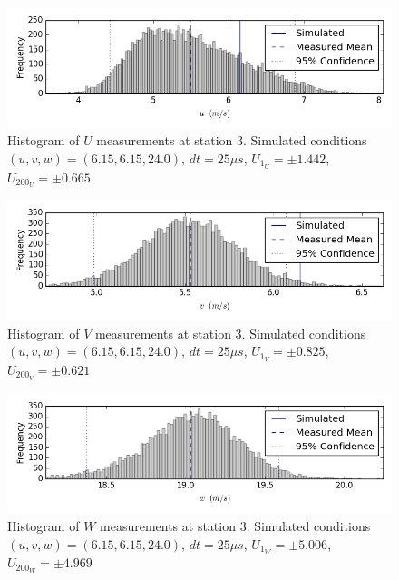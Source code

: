\begin{figure}[H]
\centering
\includegraphics[width=6in]{figs/Ely_May28th03001/uncertainty_Ely_May28th03001_U}
\caption{Histogram of $U$ measurements at station 3. Simulated conditions $(u,v,w)=(6.15, 6.15, 24.0)$, $dt=25 \mu s$, $U_1_U=\pm 1.442$, $U_200_U=\pm 0.665$}
\label{fig:uncertainty_Ely_May28th03001_U}
\end{figure}


\begin{figure}[H]
\centering
\includegraphics[width=6in]{figs/Ely_May28th03001/uncertainty_Ely_May28th03001_V}
\caption{Histogram of $V$ measurements at station 3. Simulated conditions $(u,v,w)=(6.15, 6.15, 24.0)$, $dt=25 \mu s$, $U_1_V=\pm 0.825$, $U_200_V=\pm 0.621$}
\label{fig:uncertainty_Ely_May28th03001_V}
\end{figure}


\begin{figure}[H]
\centering
\includegraphics[width=6in]{figs/Ely_May28th03001/uncertainty_Ely_May28th03001_W}
\caption{Histogram of $W$ measurements at station 3. Simulated conditions $(u,v,w)=(6.15, 6.15, 24.0)$, $dt=25 \mu s$, $U_1_W=\pm 5.006$, $U_200_W=\pm 4.969$}
\label{fig:uncertainty_Ely_May28th03001_W}
\end{figure}


